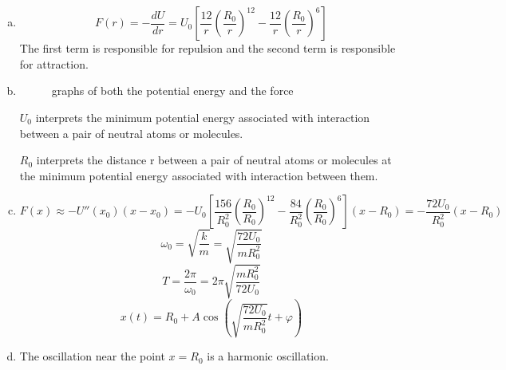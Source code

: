\documentclass{article}
\begin{document}
\section{}
\begin{enumerate}[(a)]
	\item
	$$F(r)=-\frac{dU}{dr}=U_0\left[\frac{12}{r}\left(\frac{R_0}{r}\right)^{12}-\frac{12}{r}\left(\frac{R_0}{r}\right)^{6}\right]$$
	The first term is responsible for repulsion and the second term is responsible for attraction.
	\item
	\begin{figure}[b!]
		\centering
		\caption{graphs of both the potential energy and the force}
		\label{fig-sample}
	\end{figure}
	$U_0$ interprets the minimum potential energy associated with interaction between a pair of neutral atoms or molecules.
	
	$R_0$ interprets the distance r between a pair of neutral atoms or molecules at the minimum potential energy associated with interaction between them.
	\item
	$$F(x)\approx-U''(x_0)(x-x_0)=-U_0\left[\frac{156}{R_0^2}\left(\frac{R_0}{R_0}\right)^{12}-\frac{84}{R_0^2}\left(\frac{R_0}{R_0}\right)^{6}\right](x-R_0)=-\frac{72U_0}{R_0^2}(x-R_0)$$
	$$\omega_0=\sqrt{\frac{k}{m}}=\sqrt{\frac{72U_0}{mR_0^2}}$$
	$$T=\frac{2\pi}{\omega_0}=2\pi\sqrt{\frac{mR_0^2}{72U_0}}$$
	$$x(t)=R_0+A\cos(\sqrt{\frac{72U_0}{mR_0^2}}t+\varphi)$$
	\item
	The oscillation near the point $x=R_0$ is a harmonic oscillation.
\end{enumerate}
\end{document}
